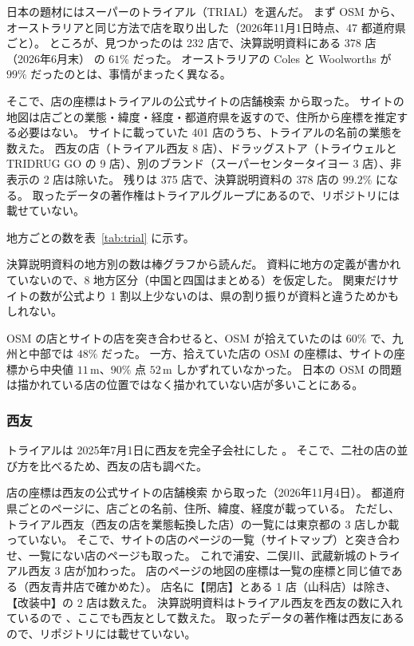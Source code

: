 \documentclass[a4paper,11pt]{ltjsarticle}
\begin{document}
日本の題材にはスーパーのトライアル（TRIAL）を選んだ。
まず OSM から、オーストラリアと同じ方法で店を取り出した（2026年11月1日時点、47 都道府県ごと）。
ところが、見つかったのは 232 店で、決算説明資料にある 378 店（2026年6月末）\cite{TrialFY26} の $61\%$ だった。
オーストラリアの Coles と Woolworths が $99\%$ だったのとは、事情がまったく異なる。

そこで、店の座標はトライアルの公式サイトの店舗検索 \cite{TrialSite} から取った。
サイトの地図は店ごとの業態・緯度・経度・都道府県を返すので、住所から座標を推定する必要はない。
サイトに載っていた 401 店のうち、トライアルの名前の業態を数えた。
西友の店（トライアル西友 8 店）、ドラッグストア（トライウェルと TRIDRUG GO の 9 店）、別のブランド（スーパーセンタータイヨー 3 店）、非表示の 2 店は除いた。
残りは 375 店で、決算説明資料の 378 店の $99.2\%$ になる。
取ったデータの著作権はトライアルグループにあるので、リポジトリには載せていない。

地方ごとの数を表~\ref{tab:trial} に示す。
\begin{table}[t]
  \centering
  \caption{トライアルの地方ごとの店舗数。サイトは 2026年11月3日、公式は 2026年6月末時点。
    OSM で一致は、サイトの店から $300\,\mathrm{m}$ 以内に OSM の店があった数。}
  \label{tab:trial}
  \small
  
\end{table}
決算説明資料の地方別の数は棒グラフから読んだ。
資料に地方の定義が書かれていないので、8 地方区分（中国と四国はまとめる）を仮定した。
関東だけサイトの数が公式より 1 割以上少ないのは、県の割り振りが資料と違うためかもしれない。

OSM の店とサイトの店を突き合わせると、OSM が拾えていたのは $60\%$ で、九州と中部では $48\%$ だった。
一方、拾えていた店の OSM の座標は、サイトの座標から中央値 $11\,\mathrm{m}$、$90\%$ 点 $52\,\mathrm{m}$ しかずれていなかった。
日本の OSM の問題は描かれている店の位置ではなく描かれていない店が多いことにある。

\subsubsection{西友}
\label{sec:data-seiyu}

トライアルは 2025年7月1日に西友を完全子会社にした \cite{TrialFY26}。
そこで、二社の店の並び方を比べるため、西友の店も調べた。

店の座標は西友の公式サイトの店舗検索 \cite{SeiyuSite} から取った（2026年11月4日）。
都道府県ごとのページに、店ごとの名前、住所、緯度、経度が載っている。
ただし、トライアル西友（西友の店を業態転換した店）の一覧には東京都の 3 店しか載っていない。
そこで、サイトの店のページの一覧（サイトマップ）と突き合わせ、一覧にない店のページも取った。
これで浦安、二俣川、武蔵新城のトライアル西友 3 店が加わった。
店のページの地図の座標は一覧の座標と同じ値である（西友青井店で確かめた）。
店名に【閉店】とある 1 店（山科店）は除き、【改装中】の 2 店は数えた。
決算説明資料はトライアル西友を西友の数に入れているので \cite{TrialFY26}、ここでも西友として数えた。
取ったデータの著作権は西友にあるので、リポジトリには載せていない。
\end{document}
